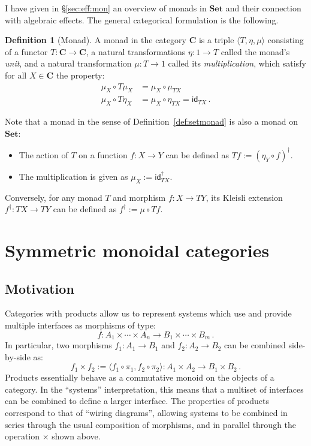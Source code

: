 \documentclass[11pt,oneside,draft]{book}
\theoremstyle{definition}
\newtheorem{definition}[theorem]{Definition}
\newcommand{\kw}[1]{\ensuremath{ \mathsf{#1} }}
\begin{document}
I have given in \S\ref{sec:eff:mon}
an overview of monads in $\mathbf{Set}$
and their connection with algebraic effects.
The general categorical formulation is the following.

\begin{definition}[Monad]
A monad in the category $\mathbf{C}$
is a triple $\langle T, \eta, \mu \rangle$
consisting of
a functor $T : \mathbf{C} \rightarrow \mathbf{C}$,
a natural transformations
$\eta : 1 \rightarrow T$
called the monad's \emph{unit},
and a natural transformation
$\mu : T \rightarrow 1$
called its \emph{multiplication},
which satisfy for all $X \in \mathbf{C}$
the property:
\begin{align*}
  \mu_X \circ T \mu_X &= \mu_X \circ \mu_{TX} \\
  \mu_X \circ T \eta_X &= \mu_X \circ \eta_{TX} = \kw{id}_{T X}
  \,.
\end{align*}
\end{definition}

Note that a monad in the sense of Definition~\ref{def:setmonad}
is also a monad on $\mathbf{Set}$:
\begin{itemize}
  \item
    The action of $T$ on a function $f : X \rightarrow Y$
    can be defined as $T f := (\eta_Y \circ f)^\dagger$.
  \item
    The multiplication is given as $\mu_X := \kw{id}_{T X}^\dagger$.
\end{itemize}
Conversely, for any monad $T$ and morphism $f : X \rightarrow TY$,
its Kleisli extension $f^\dagger : TX \rightarrow TY$ can be defined
as $f^\dagger := \mu \circ T f$.



\section{Symmetric monoidal categories} %

\subsection{Motivation} %

Categories with
products allow us to represent systems
which use and provide multiple interfaces
as morphisms of type:
\[
  f : A_1 \times \cdots \times A_n \rightarrow
      B_1 \times \cdots \times B_m
  \,.
\]
In particular,
two morphisms
$f_1 : A_1 \rightarrow B_1$ and
$f_2 : A_2 \rightarrow B_2$
can be combined side-by-side
as:
\[
  f_1 \times f_2 :=
  \langle f_1 \circ \pi_1, f_2 \circ \pi_2 \rangle :
  A_1 \times A_2 \rightarrow B_1 \times B_2
  \,.
\]
Products essentially behave as a commutative monoid
on the objects of a category.
In the ``systems'' interpretation,
this means that a multiset of interfaces
can be combined to define a larger interface.
The properties of products
correspond to that of ``wiring diagrams'',
allowing systems to be combined in series
through the usual composition of morphisms,
and in parallel through the operation $\times$
shown above.
\end{document}
